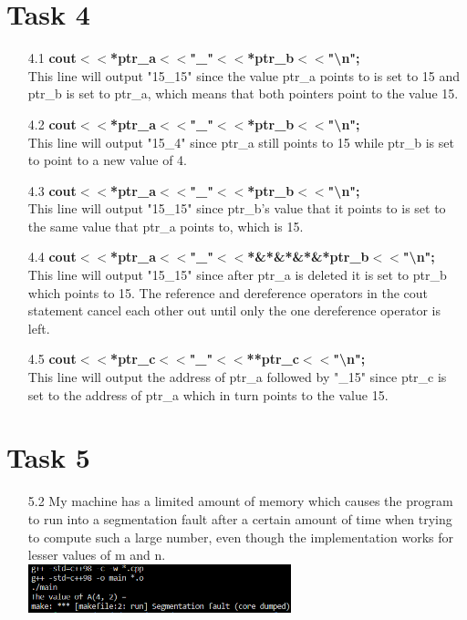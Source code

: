 \documentclass{article}
\begin{document}
\section*{Task 4}
\begin{itemize}
    \item[4.1] \textbf{cout$<<$*ptr\_a$<<$"\_"$<<$*ptr\_b$<<$"\textbackslash n";} \\
                This line will output "15\_15" since the value ptr\_a points to is set to
                15 and ptr\_b is set to ptr\_a, which means that both pointers point to the value 15.
    \item[4.2] \textbf{cout$<<$*ptr\_a$<<$"\_"$<<$*ptr\_b$<<$"\textbackslash n";} \\
                This line will output "15\_4" since ptr\_a still points to 15 while 
                ptr\_b is set to point to a new value of 4.
    \item[4.3] \textbf{cout$<<$*ptr\_a$<<$"\_"$<<$*ptr\_b$<<$"\textbackslash n";} \\
                This line will output "15\_15" since ptr\_b's value that it points to
                is set to the same value that ptr\_a points to, which is 15.
    \item[4.4] \textbf{cout$<<$*ptr\_a$<<$"\_"$<<$*\&*\&*\&*\&*ptr\_b$<<$"\textbackslash n";} \\
                This line will output "15\_15" since after ptr\_a is deleted it is set 
                to ptr\_b which points to 15. The reference and dereference operators in 
                the cout statement cancel each other out until only the one dereference 
                operator is left.
    \item[4.5] \textbf{cout$<<$*ptr\_c$<<$"\_"$<<$**ptr\_c$<<$"\textbackslash n";} \\
                This line will output the address of ptr\_a followed by "\_15" since
                ptr\_c is set to the address of ptr\_a which in turn points to the value 15.
\end{itemize}

\section*{Task 5}
\begin{itemize}
    \item[5.2] My machine has a limited amount of memory which causes the program to run into 
    a segmentation fault after a certain amount of time when trying to compute such a large number,
     even though the implementation
     works for lesser values of m and n.\\
    \includegraphics[width=0.6\textwidth]{../img/Task5_2.png}
\end{itemize}
\end{document}

